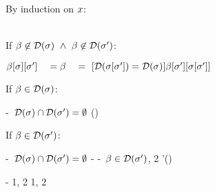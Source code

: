 By induction on $x$:

\begin{bycase}

\Case{$\bool$, $\var$}

\Case{$\tvar$}\\
If $\beta\not\in\mathcal{D}(\sigma)\ \wedge\ \beta\not\in\mathcal{D}(\sigma')$:
\begin{links}
$\beta[\sigma][\sigma']
 \\\hspace*{1em}=\\
 \beta
 \\\hspace*{1em}=\ [\mbox{$\mathcal{D}(\sigma[\sigma'])=\mathcal{D}(\sigma)$}]\\
 \beta[\sigma'][\sigma[\sigma']]$
\end{links}
If $\tvar\in\dom{\tsbsmap}$:
\begin{derivation}
     {\hyp\ $\mathcal{D}(\sigma)\cap\mathcal{D}(\sigma')=\emptyset$}
\steP
{
 \link{=}{\hyp\ $\tvar\in\dom{\tsbsmap}$}
 (\tvar)
 }
\end{derivation}
If $\beta\in\mathcal{D}(\sigma')$:
\begin{derivation}
\step{\tvar\not\in\dom{\tsbsmap}}
     {\hyp\ $\mathcal{D}(\sigma)\cap\mathcal{D}(\sigma')=\emptyset$}
     {\hyp}
     {\hyp\ $\beta\in\mathcal{D}(\sigma')$, 2}
\steP
{
 \tsbsmap'(\tvar)
 }
\end{derivation}

\Case{$\tarrO$}
\begin{derivation}
     {\hyp}
     {1, 2}
     {1, 2}
\steP
{
 \linK{=}
      {}
      {}
 \linK{=}
 }
\end{derivation}


\end{bycase}
